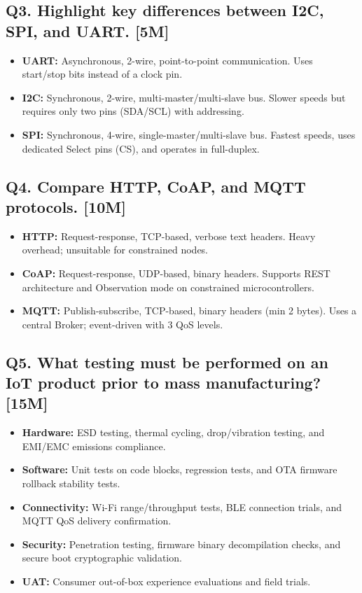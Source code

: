 \subsection{Q3. Highlight key differences between I2C, SPI, and UART. [5M]}
\begin{itemize}
  \item   \textbf{UART:} Asynchronous, 2-wire, point-to-point communication. Uses start/stop bits instead of a clock pin.
  \item   \textbf{I2C:} Synchronous, 2-wire, multi-master/multi-slave bus. Slower speeds but requires only two pins (SDA/SCL) with addressing.
  \item   \textbf{SPI:} Synchronous, 4-wire, single-master/multi-slave bus. Fastest speeds, uses dedicated Select pins (CS), and operates in full-duplex.
\end{itemize}

\subsection{Q4. Compare HTTP, CoAP, and MQTT protocols. [10M]}
\begin{itemize}
  \item   \textbf{HTTP:} Request-response, TCP-based, verbose text headers. Heavy overhead; unsuitable for constrained nodes.
  \item   \textbf{CoAP:} Request-response, UDP-based, binary headers. Supports REST architecture and Observation mode on constrained microcontrollers.
  \item   \textbf{MQTT:} Publish-subscribe, TCP-based, binary headers (min 2 bytes). Uses a central Broker; event-driven with 3 QoS levels.
\end{itemize}

\subsection{Q5. What testing must be performed on an IoT product prior to mass manufacturing? [15M]}
\begin{itemize}
  \item   \textbf{Hardware:} ESD testing, thermal cycling, drop/vibration testing, and EMI/EMC emissions compliance.
  \item   \textbf{Software:} Unit tests on code blocks, regression tests, and OTA firmware rollback stability tests.
  \item   \textbf{Connectivity:} Wi-Fi range/throughput tests, BLE connection trials, and MQTT QoS delivery confirmation.
  \item   \textbf{Security:} Penetration testing, firmware binary decompilation checks, and secure boot cryptographic validation.
  \item   \textbf{UAT:} Consumer out-of-box experience evaluations and field trials.
\end{itemize}


